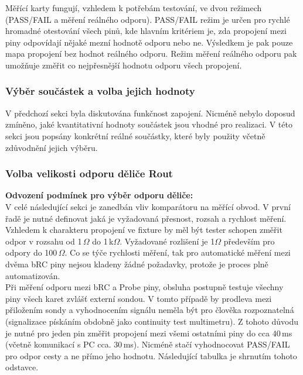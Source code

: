     Měřící karty fungují, vzhledem k potřebám testování, ve dvou režimech (PASS/FAIL a měření reálného odporu).
    PASS/FAIL režim je určen pro rychlé hromadné otestování všech pinů,
    kde hlavním kritériem je, zda propojení mezi piny odpovídají nějaké mezní hodnotě odporu nebo ne.
    Výsledkem je pak pouze mapa propojení bez hodnot reálného odporu.
    Režim měření reálného odporu pak umožňuje změřit co nejpřesnější hodnotu odporu všech propojení.
\clearpage
\subsubsection{Výběr součástek a volba jejich hodnoty}
V předchozí sekci byla diskutována funkčnost zapojení.
Nicméně nebylo doposud zmíněno, jaké kvantitativní hodnoty součástek jsou vhodné pro realizaci.
V této sekci jsou popsány konkrétní reálné součástky, které byly použity včetně zdůvodnění jejich výběru.\\

\subsubsection{Volba velikosti odporu děliče Rout}
\textbf{Odvození podmínek pro výběr odporu děliče:}\\
V celé následující sekci je zanedbán vliv komparátoru na měřící obvod.
V první řadě je nutné definovat jaká je vyžadovaná přesnost, rozsah a rychlost měření.
Vzhledem k charakteru propojení ve fixture by měl být tester schopen změřit odpor v rozsahu od 1\,$\Omega$ do 1\,k$\Omega$.
Vyžadované rozlišení je 1$\Omega$ především pro odpory do 100\,$\Omega$.
Co se týče rychlosti měření, tak pro automatické měření mezi dvěma bRC piny nejsou kladeny žádné požadavky,
protože je proces plně automatizován.\\
Při měření odporu mezi bRC a Probe piny, obsluha postupně testuje všechny piny všech karet zvlášť externí sondou.
V tomto případě by prodleva mezi přiložením sondy a vyhodnocením signálu neměla být pro
člověka rozpoznatelná (signalizace pískáním obdobně jako continuity test multimetru).
Z tohoto důvodu je nutné pro jeden pin změřit propojení mezi všemi ostatními piny
do cca 40\,ms (včetně komunikací s PC cca. 30\,ms).
Nicméně stačí vyhodnocovat PASS/FAIL pro odpor cesty a ne přímo jeho hodnotu.
Následující tabulka je shrnutím tohoto odstavce.\\


